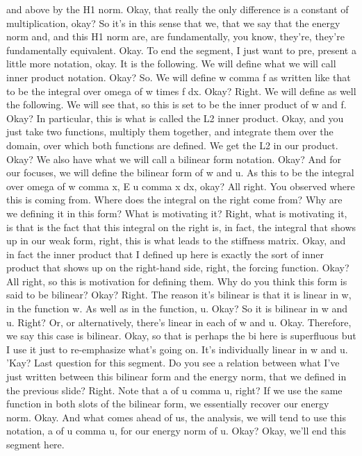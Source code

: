 \documentclass[10pt]{article}
\begin{document}
{and above by the H1 norm. Okay, that really the only difference is a constant of multiplication, okay? So it's in this sense that we, that we say that the energy norm and, and this H1 norm are, are fundamentally, you know, they're, they're fundamentally equivalent. Okay. To end the segment, I just want to pre, present a little more notation, okay. It is the following. We will define what we will call inner product notation. Okay? So. We will define w comma f as written like that to be the integral over omega of w times f dx. Okay? Right. We will define as well the following. We will see that, so this is set to be the inner product of w and f. Okay? In particular, this is what is called the L2 inner product. Okay, and you just take two functions, multiply them together, and integrate them over the domain, over which both functions are defined. We get the L2 in our product. Okay? We also have what we will call a bilinear form notation. Okay? And for our focuses, we will define the bilinear form of w and u. As this to be the integral over omega of w comma x, E u comma x dx, okay? All right. You observed where this is coming from. Where does the integral on the right come from? Why are we defining it in this form? What is motivating it? Right, what is motivating it, is that is the fact that this integral on the right is, in fact, the integral that shows up in our weak form, right, this is what leads to the stiffness matrix. Okay, and in fact the inner product that I defined up here is exactly the sort of inner product that shows up on the right-hand side, right, the forcing function. Okay? All right, so this is motivation for defining them. Why do you think this form is said to be bilinear? Okay? Right. The reason it's bilinear is that it is linear in w, in the function w. As well as in the function, u. Okay? So it is bilinear in w and u. Right? Or, or alternatively, there's linear in each of w and u. Okay. Therefore, we say this case is bilinear. Okay, so that is perhaps the bi here is superfluous but I use it just to re-emphasize what's going on. It's individually linear in w and u. 'Kay? Last question for this segment. Do you see a relation between what I've just written between this bilinear form and the energy norm, that we defined in the previous slide? Right. Note that a of u comma u, right? If we use the same function in both slots of the bilinear form, we essentially recover our energy norm. Okay. And what comes ahead of us, the analysis, we will tend to use this notation, a of u comma u, for our energy norm of u. Okay? Okay, we'll end this segment here.

}
\end{document}
